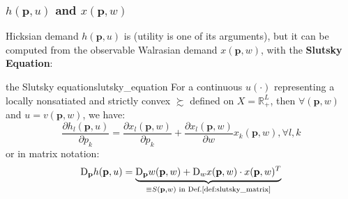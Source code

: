 \subsubsection*{$h(\mathbf{p},u)$ and $x(\mathbf{p},w)$}
Hicksian demand $h(\mathbf{p},u)$ is  (utility is one of its arguments), but it can be computed from the observable Walrasian demand $x(\mathbf{p},w)$, with the \textbf{Slutsky Equation}:
\begin{theorem}{the Slutsky equation}{slutsky_equation}
    For a continuous $u(\cdot)$ representing a locally nonsatiated and strictly convex $\succsim$ defined on $X=\mathbb{R}^L_+$, then $\forall (\mathbf{p},w)$ and $u=v(\mathbf{p},w)$, we have:
    $$ \frac{\partial h_l(\mathbf{p},u)}{\partial p_k} = \frac{\partial x_l(\mathbf{p},w)}{\partial p_k} +\frac{\partial x_l(\mathbf{p},w)}{\partial w}x_k(\mathbf{p},w), \forall l,k $$
    or in matrix notation:
    $$ \mathrm{D}_{\mathbf{p}} h(\mathbf{p},u) = \underbrace{\mathrm{D}_{\mathbf{p}} w(\mathbf{p},w)+\mathrm{D}_w x(\mathbf{p},w)\cdot x(\mathbf{p},w)^T}_{\equiv S(\mathbf{p},w) \text{ in Def.\ref{def:slutsky_matrix}}}$$
\end{theorem}

